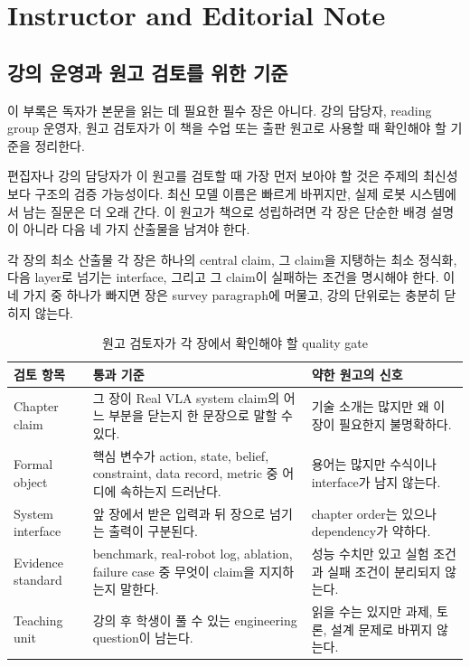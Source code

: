 \chapter*{Instructor and Editorial Note}

\section*{강의 운영과 원고 검토를 위한 기준}

이 부록은 독자가 본문을 읽는 데 필요한 필수 장은 아니다. 강의 담당자, reading group 운영자, 원고 검토자가 이 책을 수업 또는 출판 원고로 사용할 때 확인해야 할 기준을 정리한다.

편집자나 강의 담당자가 이 원고를 검토할 때 가장 먼저 보아야 할 것은 주제의 최신성보다 구조의 검증 가능성이다. 최신 모델 이름은 빠르게 바뀌지만, 실제 로봇 시스템에서 남는 질문은 더 오래 간다. 이 원고가 책으로 성립하려면 각 장은 단순한 배경 설명이 아니라 다음 네 가지 산출물을 남겨야 한다.

\begin{definitionbox}{각 장의 최소 산출물}
각 장은 하나의 central claim, 그 claim을 지탱하는 최소 정식화, 다음 layer로 넘기는 interface, 그리고 그 claim이 실패하는 조건을 명시해야 한다. 이 네 가지 중 하나가 빠지면 장은 survey paragraph에 머물고, 강의 단위로는 충분히 닫히지 않는다.
\end{definitionbox}

\begin{table}[ht]
\centering
\caption{원고 검토자가 각 장에서 확인해야 할 quality gate}
\label{tab:appendix-editorial-quality-gate}
\small
\begin{tabularx}{\textwidth}{p{27mm}X X}
\toprule
검토 항목 & 통과 기준 & 약한 원고의 신호 \\
\midrule
Chapter claim & 그 장이 Real VLA system claim의 어느 부분을 닫는지 한 문장으로 말할 수 있다. & 기술 소개는 많지만 왜 이 장이 필요한지 불명확하다. \\
Formal object & 핵심 변수가 action, state, belief, constraint, data record, metric 중 어디에 속하는지 드러난다. & 용어는 많지만 수식이나 interface가 남지 않는다. \\
System interface & 앞 장에서 받은 입력과 뒤 장으로 넘기는 출력이 구분된다. & chapter order는 있으나 dependency가 약하다. \\
Evidence standard & benchmark, real-robot log, ablation, failure case 중 무엇이 claim을 지지하는지 말한다. & 성능 수치만 있고 실험 조건과 실패 조건이 분리되지 않는다. \\
Teaching unit & 강의 후 학생이 풀 수 있는 engineering question이 남는다. & 읽을 수는 있지만 과제, 토론, 설계 문제로 바뀌지 않는다. \\
\bottomrule
\end{tabularx}
\end{table}

